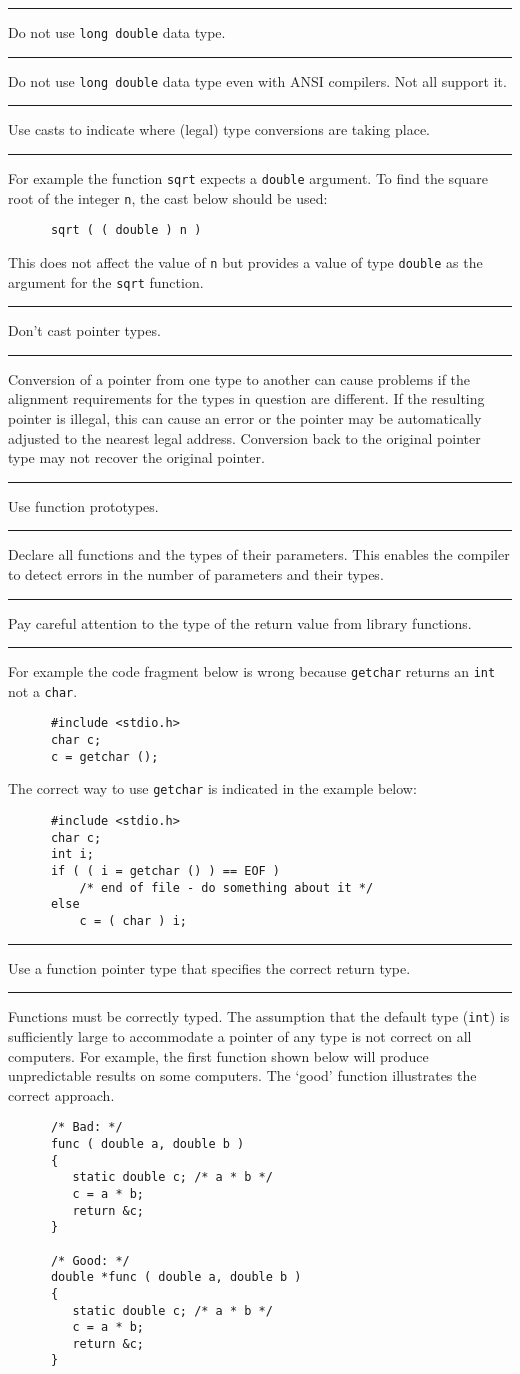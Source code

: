 \documentclass[twoside,11pt]{article}
\newcounter{sruleno}
\newcommand{\srule}[1]{
    \addtocounter{sruleno}{1}
    \goodbreak
    \rule[0.5ex]{\textwidth}{0.3mm}
    {\Large #1 \hfill {\thesruleno}}
    \rule[0.5ex]{\textwidth}{0.1mm}
}
\newcommand{\srule}[1]{
       \addtocounter{sruleno}{1}
       \begin{rawhtml} <HR> \end{rawhtml}
       {\Large \thesruleno}~~~~{\Large #1}
       \begin{rawhtml} <HR> \end{rawhtml}
       \end{tabular}
  }
\begin{document}
\srule{Do not use {\tt long double} data type.}
Do not use {\tt long double} data type even with ANSI compilers. Not all
support it.

\srule{Use casts to indicate where (legal) type conversions are taking
place.}
For example the function {\tt sqrt} expects a {\tt double} argument.
To find the square root of the integer {\tt n}, the cast below should be
used:
\begin{verbatim}
      sqrt ( ( double ) n )
\end{verbatim}
This does not affect the value of {\tt n} but provides a value of type
{\tt double} as the argument for the {\tt sqrt} function.


\srule{Don't cast pointer types.}
Conversion of a pointer from one type to another can cause problems if the
alignment requirements for the types in question are different.
If the resulting pointer is illegal, this can cause an error or the pointer
may be automatically adjusted to the nearest legal address.
Conversion back to the original pointer type may not recover the original
pointer.

\srule{Use function prototypes.}
Declare all functions and the types of their parameters.  This enables the
compiler to detect errors in the number of parameters and their types.

\srule{Pay careful attention to the type of the return value from
library functions.}
For example the code fragment below is wrong because {\tt getchar} returns
an {\tt int} not a {\tt char}.
\begin{verbatim}
      #include <stdio.h>
      char c;
      c = getchar ();
\end{verbatim}
The correct way to use {\tt getchar} is indicated in the example below:
\begin{verbatim}
      #include <stdio.h>
      char c;
      int i;
      if ( ( i = getchar () ) == EOF )
          /* end of file - do something about it */
      else
          c = ( char ) i;
\end{verbatim}

\srule{Use a function pointer type that specifies the correct return type.}
Functions must be correctly typed.
The assumption that the default
type ({\tt int}) is sufficiently large to accommodate a pointer of any
type is not correct on all computers.
For example,  the first function shown below will produce unpredictable
results on some computers.
The `good' function illustrates the correct approach.
\begin{verbatim}
      /* Bad: */
      func ( double a, double b )
      {
         static double c; /* a * b */
         c = a * b;
         return &c;
      }

      /* Good: */
      double *func ( double a, double b )
      {
         static double c; /* a * b */
         c = a * b;
         return &c;
      }
\end{verbatim}
\end{document}
